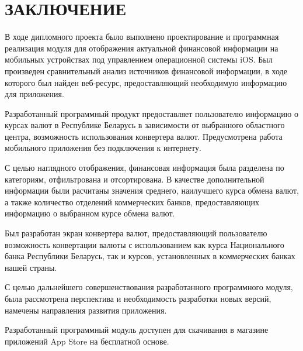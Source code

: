 \section*{ЗАКЛЮЧЕНИЕ}

В ходе дипломного проекта было выполнено проектирование и программная реализация
модуля для отображения актуальной финансовой информации на мобильных устройствах
под управлением операционной системы iOS. Был произведен сравнительный
анализ источников финансовой информации, в ходе которого был найден
веб-ресурс, предоставляющий необходимую информацию для приложения.

Разработанный программный продукт предоставляет пользователю информацию о курсах
валют в Республике Беларусь в зависимости от выбранного областного центра,
возможность использования конвертера валют. Предусмотрена работа мобильного
приложения без подключения к интернету.

С целью наглядного отображения, финансовая информация была разделена
по категориям, отфильтрована и отсортирована. В качестве дополнительной
информации были расчитаны значения среднего, наилучшего курса обмена валют,
а также количество отделений коммерческих банков, предоставляющих информацию о
выбранном курсе обмена валют.

Был разработан экран конвертера валют, предоставляющий пользователю возможность
конвертации валюты с использованием как курса Национального банка Республики
Беларусь, так и курсов, установленных в коммерческих банках нашей страны.

С целью дальнейшего совершенствования разработанного программного модуля,
была рассмотрена перспектива и необходимость разработки новых версий,
намечены направления развития приложения.

Разработанный программный модуль доступен для скачивания в магазине приложений
App Store на бесплатной основе.

